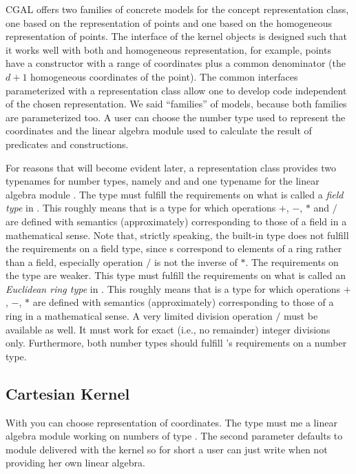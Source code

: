 CGAL offers two families of concrete models for the concept
representation class, one based on the 
representation of points and one based on the homogeneous
representation of points.  The interface of the kernel objects is
designed such that it works well with both
 and homogeneous representation, for
example, points have a constructor with a range of coordinates plus a
common denominator (the $d+1$ homogeneous coordinates of the point).
The common interfaces parameterized with a representation class allow
one to develop code independent of the chosen representation.  We said
``families'' of models, because both families are parameterized too.
A user can choose the number type used to represent the coordinates
and the linear algebra module used to calculate the result of
predicates and constructions.

For reasons that will become evident later, a representation class
provides two typenames for number types,
namely  and  and one typename for the linear
algebra module .
The type  must fulfill the
requirements on what is called a {\em field type} in \cgal. This
roughly means that  is a type for which operations $+$,
$-$, $*$ and $/$ are defined with semantics (approximately)
corresponding to those of a field in a mathematical sense. Note that,
strictly speaking, the built-in type  does not fulfill the
requirements on a field type, since s correspond to elements
of a ring rather than a field, especially operation $/$ is not the
inverse of $*$.  The requirements on the type  are
weaker.  This type must fulfill the requirements on what is called an
{\em Euclidean ring type} in \cgal. This roughly means that
 is a type for which operations $+$, $-$, $*$ are
defined with semantics (approximately) corresponding to those of a
ring in a mathematical sense.  A very limited division operation $/$
must be available as well.  It must work for exact (i.e., no
remainder) integer divisions only.  Furthermore, both number types
should fulfill \cgal's requirements on a number type.  

\subsection{Cartesian Kernel}
With  you can choose
 representation of coordinates. The type
 must me a linear algebra module working on numbers
of type . The second parameter defaults to module
delivered with the kernel so for short a user can just write
 when not providing her own linear
algebra.


